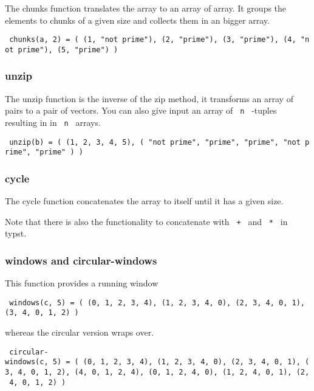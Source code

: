 The chunks function translates the array to an array of array. It groups
the elements to chunks of a given size and collects them in an bigger
array.

\texttt{\ chunks(a,\ 2)\ =\ (\ (1,\ "not\ prime"),\ (2,\ "prime"),\ (3,\ "prime"),\ (4,\ "not\ prime"),\ (5,\ "prime")\ )\ }

\subsubsection{unzip}\label{unzip}

The unzip function is the inverse of the zip method, it transforms an
array of pairs to a pair of vectors. You can also give input an array of
\texttt{\ n\ } -tuples resulting in in \texttt{\ n\ } arrays.

\texttt{\ unzip(b)\ =\ (\ (1,\ 2,\ 3,\ 4,\ 5),\ (\ "not\ prime",\ "prime",\ "prime",\ "not\ prime",\ "prime"\ )\ )\ }

\subsubsection{cycle}\label{cycle}

The cycle function concatenates the array to itself until it has a given
size.

\begin{Shaded}
\begin{Highlighting}[]
\end{Highlighting}
\end{Shaded}

Note that there is also the functionality to concatenate with
\texttt{\ +\ } and \texttt{\ *\ } in typst.

\subsubsection{windows and
circular-windows}\label{windows-and-circular-windows}

This function provides a running window

\texttt{\ windows(c,\ 5)\ =\ (\ (0,\ 1,\ 2,\ 3,\ 4),\ (1,\ 2,\ 3,\ 4,\ 0),\ (2,\ 3,\ 4,\ 0,\ 1),\ (3,\ 4,\ 0,\ 1,\ 2)\ )\ }

whereas the circular version wraps over.

\texttt{\ circular-windows(c,\ 5)\ =\ (\ (0,\ 1,\ 2,\ 3,\ 4),\ (1,\ 2,\ 3,\ 4,\ 0),\ (2,\ 3,\ 4,\ 0,\ 1),\ (3,\ 4,\ 0,\ 1,\ 2),\ (4,\ 0,\ 1,\ 2,\ 4),\ (0,\ 1,\ 2,\ 4,\ 0),\ (1,\ 2,\ 4,\ 0,\ 1),\ (2,\ 4,\ 0,\ 1,\ 2)\ )\ }

